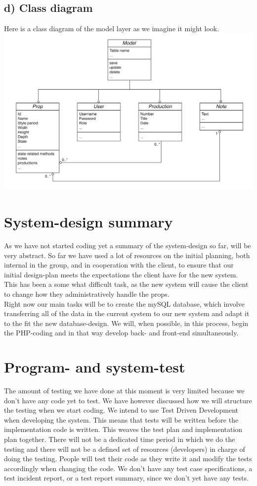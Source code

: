 \documentclass[12pt]{article}
\begin{document}
\subsection{d) Class diagram}
Here is a class diagram of the model layer as we imagine it might look.
\newline
\newline
\includegraphics[scale=0.2]{class-diagram.png}
\section{System-design summary}
As we have not started coding yet a summary of the system-design so far, will be very abstract. So far we have used a lot of resources on the initial planning, both internal in the group, and in cooperation with the client, to ensure that our initial design-plan meets the expectations the client have for the new system. This has been a some what difficult task, as the new system will cause the client to change how they administratively handle the props. \\ 
Right now our main tasks will be to create the mySQL database, which involve transferring all of the data in the current system to our new system and adapt it to the fit the new database-design. We will, when possible, in this process, begin the PHP-coding and in that way develop back- and front-end simultaneously.  
\section{Program- and system-test}
The amount of testing we have done at this moment is very limited because we don't have any code yet to test. We have however discussed how we will structure the testing when we start coding.
\newline
\newline
We intend to use Test Driven Development when developing the system. This means that tests will be written before the implementation code is written. This weaves the test plan and implementation plan together. There will not be a dedicated time period in which we do the testing and there will not be a defined set of resources (developers) in charge of doing the testing. People will test their code as they write it and modify the tests accordingly when changing the code.
\newline
\newline
We don't have any test case specifications, a test incident report, or a test report summary, since we don't yet have any tests.
\end{document}
